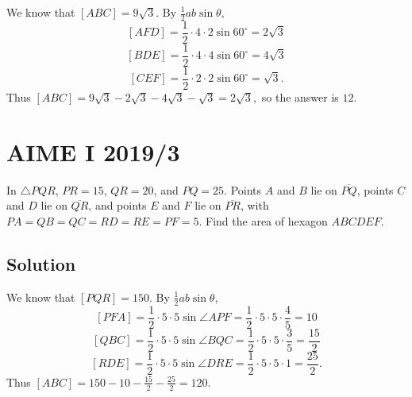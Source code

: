 \documentclass[mast]{lucky}
\begin{document}
We know that $[ABC]=9\sqrt{3}.$ By $\frac{1}{2}ab\sin\theta,$
\[[AFD]=\frac{1}{2}\cdot 4\cdot 2\sin 60^{\circ}=2\sqrt{3}\]
\[[BDE]=\frac{1}{2}\cdot 4\cdot 4\sin 60^{\circ}=4\sqrt{3}\]
\[[CEF]=\frac{1}{2}\cdot 2\cdot 2\sin 60^{\circ}=\sqrt{3}.\]
Thus $[ABC]=9\sqrt{3}-2\sqrt{3}-4\sqrt{3}-\sqrt{3}=2\sqrt{3},$ so the answer is $12.$

\begin{center}
\end{center}

\pagebreak\section{AIME I 2019/3}
In $\triangle PQR$, $PR=15$, $QR=20$, and $PQ=25$. Points $A$ and $B$ lie on $\overline{PQ}$, points $C$ and $D$ lie on $\overline{QR}$, and points $E$ and $F$ lie on $\overline{PR}$, with $PA=QB=QC=RD=RE=PF=5$. Find the area of hexagon $ABCDEF$.

\subsection{Solution}
We know that $[PQR]=150.$ By $\frac{1}{2}ab\sin\theta,$
\[[PFA]=\frac{1}{2}\cdot 5\cdot 5\sin \angle APF=\frac{1}{2}\cdot 5\cdot 5\cdot\frac{4}{5}=10\]
\[[QBC]=\frac{1}{2}\cdot 5\cdot 5\sin \angle BQC=\frac{1}{2}\cdot 5\cdot 5\cdot \frac{3}{5}=\frac{15}{2}\]
\[[RDE]=\frac{1}{2}\cdot 5\cdot 5\sin \angle DRE=\frac{1}{2}\cdot 5\cdot 5\cdot 1=\frac{25}{2}.\]
Thus $[ABC]=150-10-\frac{15}{2}-\frac{25}{2}=120.$
\end{document}
